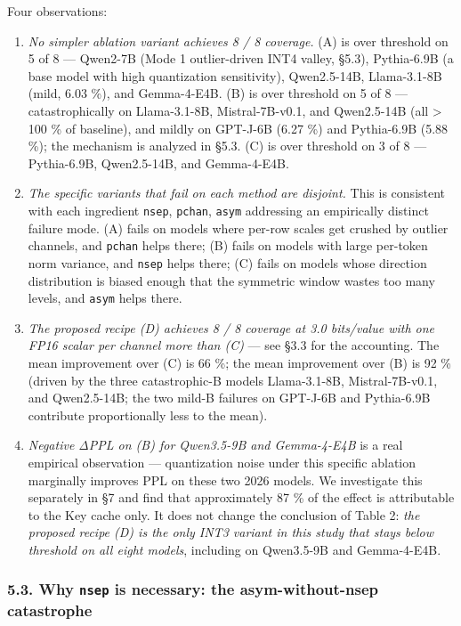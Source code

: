 \documentclass[
]{article}
\begin{document}
Four observations:

\begin{enumerate}
\def\labelenumi{\arabic{enumi}.}
\item
  \emph{No simpler ablation variant achieves 8 / 8 coverage.} (A) is
  over threshold on 5 of 8 --- Qwen2-7B (Mode 1 outlier-driven INT4
  valley, §5.3), Pythia-6.9B (a base model with high quantization
  sensitivity), Qwen2.5-14B, Llama-3.1-8B (mild, 6.03 \%), and
  Gemma-4-E4B. (B) is over threshold on 5 of 8 --- catastrophically on
  Llama-3.1-8B, Mistral-7B-v0.1, and Qwen2.5-14B (all \textgreater{} 100
  \% of baseline), and mildly on GPT-J-6B (6.27 \%) and Pythia-6.9B
  (5.88 \%); the mechanism is analyzed in §5.3. (C) is over threshold on
  3 of 8 --- Pythia-6.9B, Qwen2.5-14B, and Gemma-4-E4B.
\item
  \emph{The specific variants that fail on each method are disjoint.}
  This is consistent with each ingredient \texttt{nsep}, \texttt{pchan},
  \texttt{asym} addressing an empirically distinct failure mode. (A)
  fails on models where per-row scales get crushed by outlier channels,
  and \texttt{pchan} helps there; (B) fails on models with large
  per-token norm variance, and \texttt{nsep} helps there; (C) fails on
  models whose direction distribution is biased enough that the
  symmetric window wastes too many levels, and \texttt{asym} helps
  there.
\item
  \emph{The proposed recipe (D) achieves 8 / 8 coverage at 3.0
  bits/value with one FP16 scalar per channel more than (C)} --- see
  §3.3 for the accounting. The mean improvement over (C) is 66 \%; the
  mean improvement over (B) is 92 \% (driven by the three catastrophic-B
  models Llama-3.1-8B, Mistral-7B-v0.1, and Qwen2.5-14B; the two mild-B
  failures on GPT-J-6B and Pythia-6.9B contribute proportionally less to
  the mean).
\item
  \emph{Negative ΔPPL on (B) for Qwen3.5-9B and Gemma-4-E4B} is a real
  empirical observation --- quantization noise under this specific
  ablation marginally improves PPL on these two 2026 models. We
  investigate this separately in §7 and find that approximately 87 \% of
  the effect is attributable to the Key cache only. It does not change
  the conclusion of Table 2: \emph{the proposed recipe (D) is the only
  INT3 variant in this study that stays below threshold on all eight
  models}, including on Qwen3.5-9B and Gemma-4-E4B.
\end{enumerate}

\subsubsection{\texorpdfstring{5.3. Why \texttt{nsep} is necessary: the
asym-without-nsep
catastrophe}{5.3. Why nsep is necessary: the asym-without-nsep catastrophe}}\label{why-nsep-is-necessary-the-asym-without-nsep-catastrophe}
\end{document}
